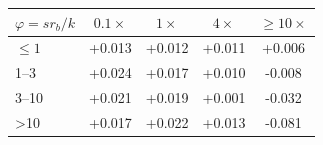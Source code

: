 \begin{tabular}{lcccc}\toprule
$\varphi=sr_b/k$ & $0.1\times$ & $1\times$ & $4\times$ & $\ge10\times$\\\midrule
$\le1$ & +0.013 & +0.012 & +0.011 & +0.006\\
1--3 & +0.024 & +0.017 & +0.010 & -0.008\\
3--10 & +0.021 & +0.019 & +0.001 & -0.032\\
>10 & +0.017 & +0.022 & +0.013 & -0.081\\
\bottomrule\end{tabular}